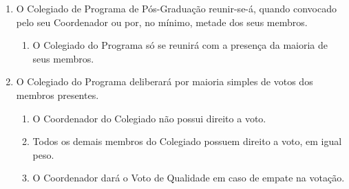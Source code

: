 \documentclass{article}
\newcommand{\singleitem}{\item[Parágrafo Único.]}
\begin{document}
\begin{enumerate}

	\item O Colegiado de Programa de Pós-Graduação reunir-se-á, quando convocado pelo seu Coordenador ou por, no mínimo, metade dos seus membros.
	\begin{enumerate}
		\singleitem O Colegiado do Programa só se reunirá com a presença da maioria de seus membros. 
	\end{enumerate}

	\item O Colegiado do Programa deliberará por maioria simples de votos dos membros presentes.
	\begin{enumerate}
		\item O Coordenador do Colegiado não possui direito a voto. 
		\item Todos os demais membros do Colegiado possuem direito a voto, em igual peso.
		\item O Coordenador dará o Voto de Qualidade em caso de empate na votação. %
	\end{enumerate}



\end{enumerate}
\end{document}
